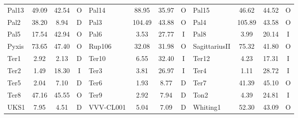\begin{table}
\begin{tabular}{l | c | c | c | l | c | c | c | l | c | c | c}
                    Pal13 &  49.09 &  42.54 &              O &
                    Pal14 &  88.95 &  35.97 &              O &
                    Pal15 &  46.62 &  44.52 &              O \\
                    Pal2 &  38.20 &   8.94 &              D &
                    Pal3 & 104.49 &  43.88 &              O &
                    Pal4 & 105.89 &  43.58 &              O \\
                    Pal5 &  17.54 &  42.94 &              O &
                    Pal6 &   3.53 &  27.77 &              I &
                    Pal8 &   3.99 &  20.14 &              I \\
                    Pyxis &  73.65 &  47.40 &              O &
                Rup106 &  32.08 &  31.98 &              O &
            SagittariusII &  75.32 &  41.80 &              O \\
                    Ter1 &   2.92 &   2.13 &              D &
                    Ter10 &   6.55 &  32.40 &              I &
                    Ter12 &   4.23 &  17.31 &              I \\
                    Ter2 &   1.49 &  18.30 &              I &
                    Ter3 &   3.81 &  26.97 &              I &
                    Ter4 &   1.11 &  28.72 &              I \\
                    Ter5 &   2.04 &   7.10 &              D &
                    Ter6 &   1.93 &   8.77 &              D &
                    Ter7 &  41.39 &  45.10 &              O \\
                    Ter8 &  47.16 &  45.55 &              O &
                    Ter9 &   2.92 &   7.94 &              D &
                    Ton2 &   4.39 &  24.81 &              I \\
                    UKS1 &   7.95 &   4.51 &              D &
                VVV-CL001 &   5.04 &   7.09 &              D &
                Whiting1 &  52.30 &  43.09 &              O \\               
            \hline
            \end{tabular}
        \end{table}
        \normalsize

